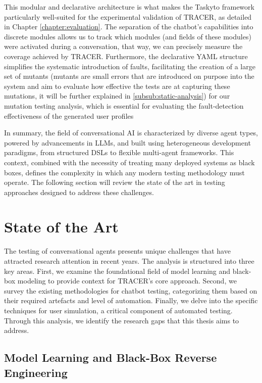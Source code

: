This modular and declarative architecture
is what makes the Taskyto framework particularly well-suited
for the experimental validation of TRACER,
as detailed in Chapter \ref{chapter:evaluation}.
The separation of the chatbot's capabilities into discrete modules
allows us to track which modules
(and fields of these modules)
were activated during a conversation,
that way, we can precisely measure the coverage
achieved by \ac{TRACER}.
Furthermore, the declarative YAML structure
simplifies the systematic introduction of faults,
facilitating the creation of a large set of mutants
(mutants are small errors that are introduced on purpose into the system
and aim to evaluate how effective the tests are at capturing these mutations,
it will be further explained in
\autoref{subsub:static-analysis})
for our mutation testing analysis,
which is essential for evaluating
the fault-detection effectiveness of the generated user profiles

\indent

In summary,
the field of conversational \ac{AI} is characterized by diverse agent types,
powered by advancements in \acp{LLM},
and built using heterogeneous development paradigms,
from structured \acp{DSL} to flexible multi-agent frameworks.
This context, combined with the necessity of treating many deployed systems as black boxes,
defines the complexity in which any modern testing methodology must operate.
The following section will review the state of the art in testing approaches designed to address these challenges.

\section{State of the Art}\label{sec:sota}

The testing of conversational agents presents unique challenges
that have attracted research attention in recent years.
The analysis is structured into three key areas.
First, we examine the foundational field of model learning
and black-box modeling to provide context for TRACER's core approach.
Second, we survey the existing methodologies for chatbot testing,
categorizing them based on their required artefacts and level of automation.
Finally, we delve into the specific techniques for user simulation,
a critical component of automated testing.
Through this analysis, we identify the research gaps that this thesis aims to address.

\subsection{Model Learning and Black-Box Reverse Engineering}

